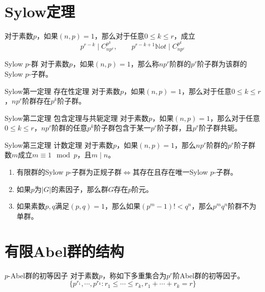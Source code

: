 \documentclass[lang = cn, scheme = chinese, thmcnt = section]{elegantbook}
\begin{document}
\section{Sylow定理}

\begin{lemma}
	对于素数$p$，如果$(n,p)=1$，那么对于任意$0\le k\le r$，成立
	$$
	p^{r-k}\mid C_{np^r}^{p^k},\qquad 
	p^{r-k+1}\mathbb{N}ot\mid C_{np^r}^{p^k}
	$$
\end{lemma}

\begin{definition}{Sylow $p$-群}
	对于素数$p$，如果$(n,p)=1$，那么称$np^r$阶群的$p^r$阶子群为该群的Sylow $p$-子群。
\end{definition}

\begin{theorem}{Sylow第一定理 存在性定理}
	对于素数$p$，如果$(n,p)=1$，那么对于任意$0\le k\le r$，$np^r$阶群存在$p^k$阶子群。
\end{theorem}

\begin{theorem}{Sylow第二定理 包含定理与共轭定理}
	对于素数$p$，如果$(n,p)=1$，那么对于任意$0\le k\le r$，$np^r$阶群的任意$p^k$阶子群包含于某一$p^r$阶子群，且$p^r$阶子群共轭。
\end{theorem}

\begin{theorem}{Sylow第三定理 计数定理}
	对于素数$p$，如果$(n,p)=1$，那么$np^r$阶群的$p^r$阶子群数$m$成立$m\equiv 1\mod p$，且$m\mid n$。
\end{theorem}

\begin{corollary}
	\begin{enumerate}
		\item 有限群的Sylow $p$-子群为正规子群$\iff$其存在且存在唯一Sylow $p$-子群。
		\item 如果$p$为$|G|$的素因子，那么群$G$存在$p$阶元。
		\item 如果素数$p,q$满足$(p,q)=1$，那么如果$(p^m-1)!<q^n$，那么$p^mq^n$阶群不为单群。
	\end{enumerate}
\end{corollary}

\section{有限Abel群的结构}

\begin{definition}{$p$-Abel群的初等因子}
	对于素数$p$，称如下多重集合为$p^r$阶Abel群的初等因子。
	$$
	\{ p^{r_1},\cdots,p^{r_k}:r_1\le\cdots\le r_k,r_1+\cdots +r_k=r \}
	$$
\end{definition}
\end{document}
